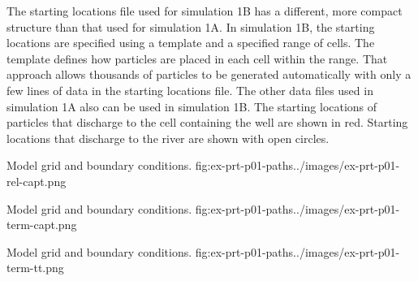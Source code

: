 The starting locations file used for simulation 1B has a different, more compact structure than that used for simulation 1A. In simulation 1B, the starting locations are specified using a template and a specified range of cells. The template defines how particles are placed in each cell within the range. That approach allows thousands of particles to be generated automatically with only a few lines of data in the starting locations file. The other data files used in simulation 1A also can be used in simulation 1B. The starting locations of particles that discharge to the cell containing the well are shown in red. Starting locations that discharge to the river are shown with open circles.

\begin{StandardFigure}{
    Model grid and boundary conditions.
    }{fig:ex-prt-p01-paths}{../images/ex-prt-p01-rel-capt.png}
\end{StandardFigure}

\begin{StandardFigure}{
    Model grid and boundary conditions.
    }{fig:ex-prt-p01-paths}{../images/ex-prt-p01-term-capt.png}
\end{StandardFigure}

\begin{StandardFigure}{
    Model grid and boundary conditions.
    }{fig:ex-prt-p01-paths}{../images/ex-prt-p01-term-tt.png}
\end{StandardFigure}